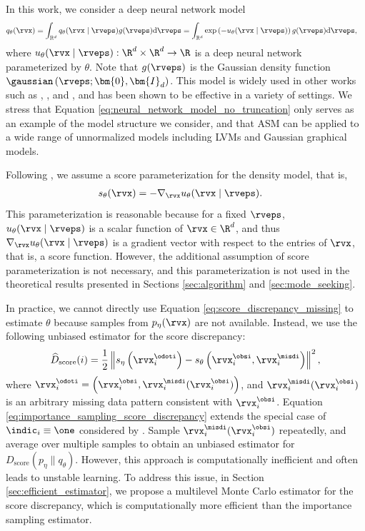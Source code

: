In this work, we consider a deep neural network model
\begin{align}
	q_{\theta}(\rvx) &= \int_{\mathbb{R}^{d}} q_{\theta}(\rvx \mid \rveps) g(\rveps) \mathrm{d} \rveps  \label{eq:neural_network_model_no_truncation}
	= \int_{\mathbb{R}^{d}} \exp\left(-u_{\theta}(\rvx \mid \rveps)\right) g(\rveps) \mathrm{d} \rveps,
\end{align}
where $u_{\theta}(\rvx \mid \rveps): \R^{d} \times \R^{d} \to \R$ is a deep neural network parameterized by $\theta$. Note that $g(\rveps)$ is the Gaussian density function $\gaussian\left( \rveps ; \bm{0}, \bm{I}_{d} \right)$. This model is widely used in other works such as \citet{Ho2020}, \citet{Song2019}, and \citet{Song2020a}, and has been shown to be effective in a variety of settings. We stress that Equation \eqref{eq:neural_network_model_no_truncation} only serves as an example of the model structure we consider, and that ASM can be applied to a wide range of unnormalized models including LVMs and Gaussian graphical models.

Following \citet{Song2019}, we assume a score parameterization for the density model, that is, 
\begin{align}
	s_{\theta}(\rvx) &= - \nabla_{\rvx} u_{\theta}(\rvx \mid \rveps). \label{eq:score_parameterization}
\end{align}
This parameterization is reasonable because for a fixed $\rveps$, $u_{\theta}(\rvx \mid \rveps)$ is a scalar function of $\rvx \in \R^{d}$, and thus $\nabla_{\rvx} u_{\theta}(\rvx \mid \rveps)$ is a gradient vector with respect to the entries of $\rvx$, that is, a score function. However, the additional assumption of score parameterization is not necessary, and this parameterization is not used in the theoretical results presented in Sections \ref{sec:algorithm} and \ref{sec:mode_seeking}.

In practice, we cannot directly use Equation \eqref{eq:score_discrepancy_missing} to estimate $\theta$ because samples from $p_{\eta}(\rvx)$ are not available. Instead, we use the following unbiased estimator for the score discrepancy:
\begin{align}
	\widehat{D}_{\text{score}}(i) = \frac{1}{2} \left\| s_{\eta} \left( \rvx_{i}^{\odoti} \right) - s_{\theta} \left( \rvx_{i}^{\obsi}, \rvx_{i}^{\misdi} \right) \right\|^{2}, \label{eq:importance_sampling_score_discrepancy}
\end{align}
where $\rvx_{i}^{\odoti} = \left( \rvx_{i}^{\obsi}, \rvx_{i}^{\misdi}(\rvx_{i}^{\obsi}) \right)$, and $\rvx_{i}^{\misdi}(\rvx_{i}^{\obsi})$ is an arbitrary missing data pattern consistent with $\rvx_{i}^{\obsi}$. 
Equation \eqref{eq:importance_sampling_score_discrepancy} extends the special case of $\indic_{i} \equiv \one$ considered by \citet{Uehara2020}. Sample $\rvx_{i}^{\misdi}(\rvx_{i}^{\obsi})$ repeatedly, and average over multiple samples to obtain an unbiased estimator for $D_{\text{score}}(p_{\eta} \| q_{\theta})$. However, this approach is computationally inefficient and often leads to unstable learning. To address this issue, in Section \ref{sec:efficient_estimator}, we propose a multilevel Monte Carlo estimator for the score discrepancy, which is computationally more efficient than the importance sampling estimator.


